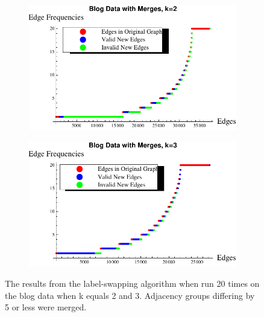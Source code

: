 \begin{figure}[htb]
\centering
\begin{subfigure}{0.5\textwidth}
	\centering
	\includegraphics[width=1\linewidth]{s40_k_2_merges.pdf}
	\label{fig:Merging, k=2}
\end{subfigure}%
\begin{subfigure}{0.5\textwidth}
	\centering
	\includegraphics[width=1\linewidth]{s40_k_3_merges.pdf}
	\label{fig:Merging, k=3}
\end{subfigure}%
\caption{The results from the label-swapping algorithm when run 20 times on the blog data when k equals 2 and 3. Adjacency groups differing by 5 or less were merged. }
\end{figure}
